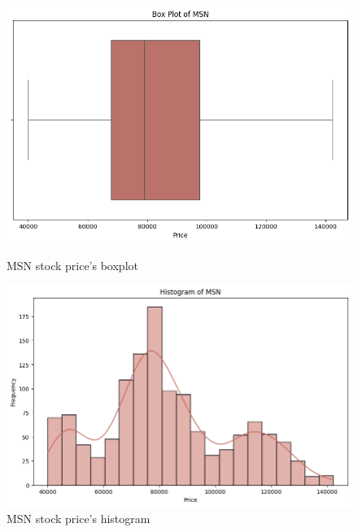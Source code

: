 \documentclass{ieeeojies}
\begin{document}
\begin{figure}[H]
    \centering
    \begin{minipage}{0.23\textwidth}
    \centering
    \includegraphics[width=1\textwidth]{BoxPlotofMSN.png}
    \caption{MSN stock price's boxplot}
    \label{fig:1}
    \end{minipage}
    \hfill
    \begin{minipage}{0.23\textwidth}
    \centering
    \includegraphics[width=1\textwidth]{HistogramOfMSN.png}
    \caption{MSN stock price's histogram}
    \label{fig:2}
    \end{minipage}
\end{figure}
\end{document}

